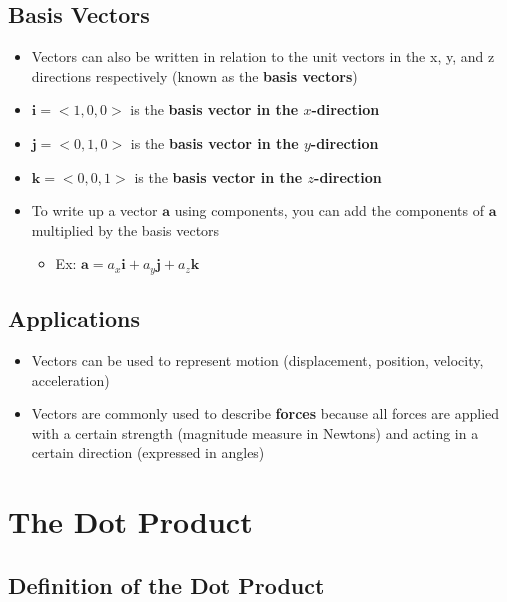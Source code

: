 \documentclass{package/notes}
\begin{document}
\subsection{Basis Vectors}
	\begin{itemize}
		\item Vectors can also be written in relation to the unit vectors in the x, y, and z directions respectively (known as the \textbf{basis vectors})
		\item $\mathbf{i} = <1,0,0>$ is the \textbf{basis vector in the $x$-direction}
		\item $\mathbf{j} = <0,1,0>$ is the \textbf{basis vector in the $y$-direction}
		\item $\mathbf{k} = <0,0,1>$ is the \textbf{basis vector in the $z$-direction}
		\item To write up a vector $\mathbf a$ using components, you can add the components of $\mathbf a$ multiplied by the basis vectors
		\begin{itemize}
			\item Ex: $\mathbf a = a_x\mathbf i + a_y\mathbf j + a_z\mathbf k$
		\end{itemize}
	
	\end{itemize}

\subsection{Applications}

	\begin{itemize}
		\item Vectors can be used to represent motion (displacement, position, velocity, acceleration)
		\item Vectors are commonly used to describe \textbf{forces} because all forces are applied with a certain strength (magnitude measure in Newtons) and acting in a certain direction (expressed in angles)
	\end{itemize}



\section{The Dot Product}

\subsection{Definition of the Dot Product}
\end{document}
